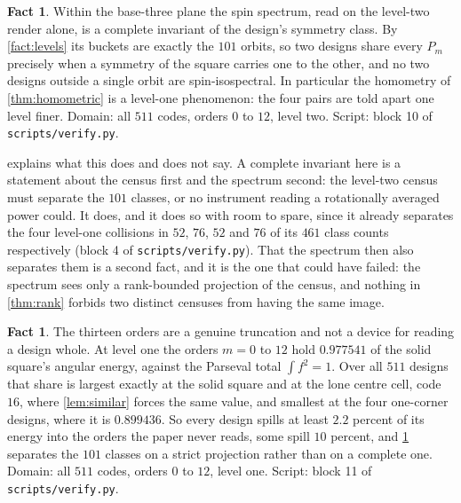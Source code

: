 \documentclass[11pt]{amsart}
\theoremstyle{definition}
\newtheorem{fact}[theorem]{Fact}
\theoremstyle{remark}
\begin{document}
\begin{fact}
\label{fact:complete}
Within the base-three plane the spin spectrum, read on the level-two render alone, is a complete invariant of the design's symmetry class. By \cref{fact:levels} its buckets are exactly the $101$ orbits, so two designs share every $P_m$ precisely when a symmetry of the square carries one to the other, and no two designs outside a single orbit are spin-isospectral. In particular the homometry of \cref{thm:homometric} is a level-one phenomenon: the four pairs are told apart one level finer. Domain: all $511$ codes, orders $0$ to $12$, level two. Script: block 10 of \texttt{scripts/verify.py}.
\end{fact}

 explains what this does and does not say. A complete invariant here is a statement about the census first and the spectrum second: the level-two census must separate the $101$ classes, or no instrument reading a rotationally averaged power could. It does, and it does so with room to spare, since it already separates the four level-one collisions in $52$, $76$, $52$ and $76$ of its $461$ class counts respectively (block 4 of \texttt{scripts/verify.py}). That the spectrum then also separates them is a second fact, and it is the one that could have failed: the spectrum sees only a rank-bounded projection of the census, and nothing in \cref{thm:rank} forbids two distinct censuses from having the same image.

\begin{fact}
\label{fact:truncation}
The thirteen orders are a genuine truncation and not a device for reading a design whole. At level one the orders $m = 0$ to $12$ hold $0.977541$ of the solid square's angular energy, against the Parseval total $\int f^2 = 1$. Over all $511$ designs that share is largest exactly at the solid square and at the lone centre cell, code $16$, where \cref{lem:similar} forces the same value, and smallest at the four one-corner designs, where it is $0.899436$. So every design spills at least $2.2$ percent of its energy into the orders the paper never reads, some spill $10$ percent, and \cref{fact:complete} separates the $101$ classes on a strict projection rather than on a complete one. Domain: all $511$ codes, orders $0$ to $12$, level one. Script: block 11 of \texttt{scripts/verify.py}.
\end{fact}
\end{document}
